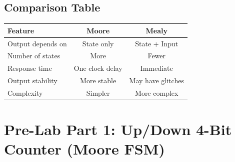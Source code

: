 \documentclass[12pt,a4paper]{article}
\begin{document}
\subsection{Comparison Table}
\begin{center}
\begin{tabular}{lcc}
\toprule
\textbf{Feature} & \textbf{Moore} & \textbf{Mealy} \\
\midrule
Output depends on & State only & State + Input \\
Number of states & More & Fewer \\
Response time & One clock delay & Immediate \\
Output stability & More stable & May have glitches \\
Complexity & Simpler & More complex \\
\bottomrule
\end{tabular}
\end{center}

\newpage
\section{Pre-Lab Part 1: Up/Down 4-Bit Counter (Moore FSM)}
\end{document}
